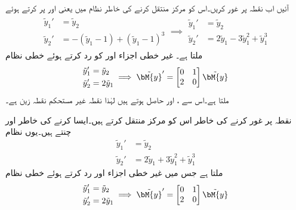 آئیں اب نقطہ  پر غور کریں۔اس کو مرکز منتقل کرنے کی خاطر نظام  میں  یعنی  اور  پر کرتے ہوئے
\begin{gather*}
\begin{aligned}
\tilde{y}_1'&=\tilde{y}_2\\
\tilde{y}_2'&=-(\tilde{y}_1-1)+(\tilde{y}_1-1)^3
\end{aligned}\implies
\begin{aligned}
\tilde{y}_1'&=\tilde{y}_2\\
\tilde{y}_2'&=2\tilde{y}_1-3\tilde{y}_1^2+\tilde{y}_1^3
\end{aligned}
\end{gather*}
ملتا ہے۔ غیر خطی اجزاء  اور  کو رد کرتے ہوئے خطی نظام
\begin{gather*}
\begin{aligned}
\tilde{y}_1'&=\tilde{y}_2\\
\tilde{y}_2'&=2\tilde{y}_1
\end{aligned}\implies 
\begin{aligned}
\tilde{\bM{y}}'=\begin{bmatrix}0&1\\2&0  \end{bmatrix}\tilde{\bM{y}}
\end{aligned}
\end{gather*}
ملتا ہے۔اس سے ،  اور  حاصل ہوتے ہیں لہٰذا نقطہ  غیر مستحکم نقطہ زین ہے۔

نقطہ  پر غور کرنے کی  خاطر اس کو مرکز منتقل کرتے ہیں۔ایسا کرنے کی خاطر  اور  چنتے ہیں۔یوں نظام
\begin{align*}
\tilde{y}_1'&=\tilde{y}_2\\
\tilde{y}_2'&=2\tilde{y}_1+3\tilde{y}_1^2+\tilde{y}_1^3
\end{align*}
ملتا ہے جس میں غیر خطی اجزاء   اور  رد کرتے ہوئے  خطی نظام
\begin{gather*}
\begin{aligned}
\tilde{y}_1'&=\tilde{y}_2\\
\tilde{y}_2'&=2\tilde{y}_1
\end{aligned}\implies 
\begin{aligned}
\tilde{\bM{y}}'=\begin{bmatrix}0&1\\2&0  \end{bmatrix}\tilde{\bM{y}}
\end{aligned}
\end{gather*}

